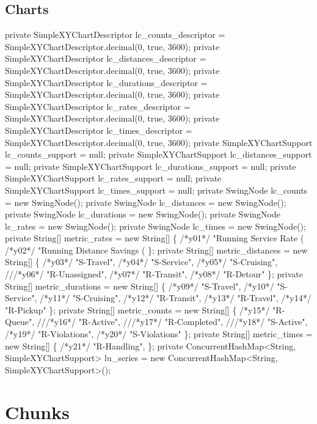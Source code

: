 \subsection{Charts}
\nwenddocs{}\plusendmoddef
private SimpleXYChartDescriptor lc_counts_descriptor = SimpleXYChartDescriptor.decimal(0, true, 3600);
private SimpleXYChartDescriptor lc_distances_descriptor = SimpleXYChartDescriptor.decimal(0, true, 3600);
private SimpleXYChartDescriptor lc_durations_descriptor = SimpleXYChartDescriptor.decimal(0, true, 3600);
private SimpleXYChartDescriptor lc_rates_descriptor = SimpleXYChartDescriptor.decimal(0, true, 3600);
private SimpleXYChartDescriptor lc_times_descriptor = SimpleXYChartDescriptor.decimal(0, true, 3600);
private SimpleXYChartSupport lc_counts_support = null;
private SimpleXYChartSupport lc_distances_support = null;
private SimpleXYChartSupport lc_durations_support = null;
private SimpleXYChartSupport lc_rates_support = null;
private SimpleXYChartSupport lc_times_support = null;
private SwingNode lc_counts = new SwingNode();
private SwingNode lc_distances = new SwingNode();
private SwingNode lc_durations = new SwingNode();
private SwingNode lc_rates = new SwingNode();
private SwingNode lc_times = new SwingNode();
private String[] metric_rates = new String[] \{
/*y01*/      "Running Service Rate (%
/*y02*/      "Running Distance Savings (%
    \};
private String[] metric_distances = new String[] \{
/*y03*/      "S-Travel",
/*y04*/      "S-Service",
/*y05*/      "S-Cruising",
///*y06*/      "R-Unassigned",
/*y07*/      "R-Transit",
/*y08*/      "R-Detour"
    \};
private String[] metric_durations = new String[] \{
/*y09*/      "S-Travel",
/*y10*/      "S-Service",
/*y11*/      "S-Cruising",
/*y12*/      "R-Transit",
/*y13*/      "R-Travel",
/*y14*/      "R-Pickup"
    \};
private String[] metric_counts = new String[] \{
/*y15*/      "R-Queue",
///*y16*/      "R-Active",
///*y17*/      "R-Completed",
///*y18*/      "S-Active",
/*y19*/      "R-Violations",
/*y20*/      "S-Violations"
    \};
private String[] metric_times = new String[] \{
/*y21*/      "R-Handling",
    \};
private ConcurrentHashMap<String, SimpleXYChartSupport> lu_series
  = new ConcurrentHashMap<String, SimpleXYChartSupport>();
\nwendcode{}\nwdocspar

\section{Chunks}
